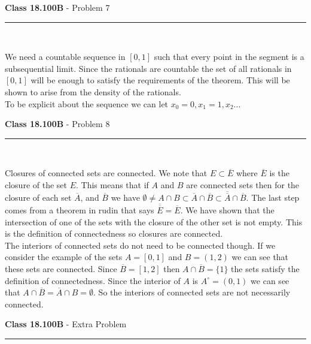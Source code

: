 \documentclass[11pt,reqno]{article}
\begin{document}
\vspace{15pt}
\begin{flushleft} 
\textbf{Class 18.100B} - Problem 7\\
\rule{500pt}{1pt}\\
\end{flushleft} 

We need a countable sequence in $[0,1]$ such that every point in the segment is a subsequential limit. Since the rationals are countable the set of all rationals in $[0,1]$ will be enough to satisfy the requirements of the theorem. This will be shown to arise from the density of the rationals.\\
\indent To be explicit about the sequence we can let $x_0 = 0, x_1 = 1, x_2...$

\vspace{15pt}
\begin{flushleft} 
\textbf{Class 18.100B} - Problem 8\\
\rule{500pt}{1pt}\\
\end{flushleft} 

Closures of connected sets are connected. We note that  $E \subset \overline{E}$ where $\overline{E}$ is the closure of the set $E$. This means that if $A$ and $B$ are connected sets then for the closure of each set $\overline{A}$, and $\overline{B}$ we have $\emptyset \neq A \cap B \subset \overline{A} \cap \overline{B} \subset \overline{\overline{A}} \cap \overline{B}$. The last step comes from a theorem in rudin that says $\overline{\overline{E}} = \overline{E}$. We have shown that the intersection of one of the sets with the closure of the other set is not empty. This is the definition of connectedness so closures are connected.\\
\indent The interiors of connected sets do not need to be connected though. If we consider the example of the sets $A = [ 0, 1 ]$ and $B = (1,2)$ we can see that these sets are connected. Since $\overline{B} = [ 1,2 ]$ then $A \cap \overline{B} = \{ 1 \}$ the sets satisfy the definition of connectedness. Since the interior of $A$ is $A^\circ = (0,1)$ we can see that $A \cap \overline{B} = \overline{A} \cap B = \emptyset $. So the interiors of connected sets are not necessarily connected.

\vspace{15pt}
\begin{flushleft} 
\textbf{Class 18.100B} - Extra Problem \\
\rule{500pt}{1pt}\\
\end{flushleft} 
\end{document}
